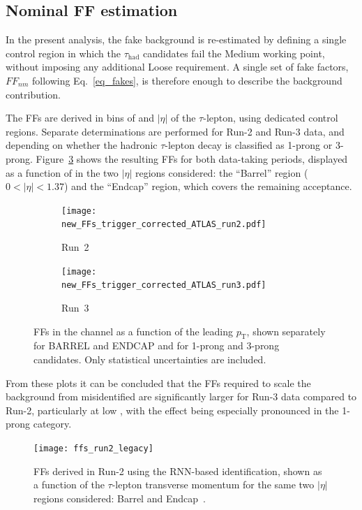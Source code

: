 \subsection{Nominal FF estimation}

In the present analysis, the fake \tauhad background is re-estimated by defining a single control region in which the $\tau_{\mathrm{had}}$ candidates fail the Medium working point, without imposing any additional Loose requirement. A single set of fake factors, $FF_{nm}$ following Eq.~\ref{eq_fakes}, is therefore enough to describe the background contribution. 

The FFs are derived in bins of \pt and $|\eta|$ of the $\tau$-lepton, using dedicated \taulephad control regions. Separate determinations are performed for Run-2 and Run-3 data, and depending on whether the hadronic $\tau$-lepton decay is classified as 1-prong or 3-prong. Figure~\ref{fig:ff_run2_run3} shows the resulting FFs for both data-taking periods, displayed as a function of \pt in the two $|\eta|$ regions considered: the ``Barrel'' region ($0<|\eta|<1.37$) and the ``Endcap'' region, which covers the remaining acceptance.
\begin{figure}[htbp]
    \centering
    \begin{subfigure}[b]{0.49\textwidth}
      \centering
      \texttt{[image: new\_FFs\_trigger\_corrected\_ATLAS\_run2.pdf]}
      \caption{Run~2}
      \label{fig:ff_run2}
    \end{subfigure}
    \hfill
    \begin{subfigure}[b]{0.49\textwidth}
      \centering
      \texttt{[image: new\_FFs\_trigger\_corrected\_ATLAS\_run3.pdf]}
      \caption{Run~3}
      \label{fig:ff_run3}
    \end{subfigure}
    \caption{
      FFs in the \tauhadhad channel as a function of the leading $p_{\mathrm{T}}$,
      shown separately for BARREL and ENDCAP and for 1-prong and 3-prong candidates. Only statistical uncertainties are included.
    }
    \label{fig:ff_run2_run3}
  \end{figure}
From these plots it can be concluded that the FFs required to scale the background from misidentified \tauhad are significantly larger for Run-3 data compared to Run-2, particularly at low \pt, with the effect being especially pronounced in the 1-prong category. 
  \begin{figure}[htbp]
    \centering
    \texttt{[image: ffs\_run2\_legacy]}
    \caption{FFs derived in Run-2 using the RNN-based \tauhad identification, 
    shown as a function of the $\tau$-lepton transverse momentum for the same two $|\eta|$ regions considered: Barrel and Endcap~\cite{serhat_tesis}.}
    \label{fig:ffs_run2_rnn}
  \end{figure}


